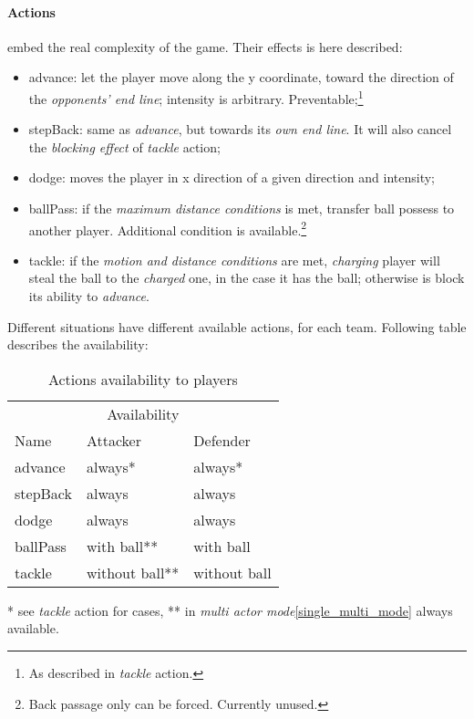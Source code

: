 \documentclass{article}
\begin{document}
\paragraph{Actions}\label{actions_description} embed the real complexity of the game. Their effects is here described:
\begin{itemize}
    \item advance: let the player move along the y coordinate, toward the direction of the \emph{opponents' end line}; intensity is arbitrary. Preventable;\footnote{As described in \emph{tackle} action.}
    \item stepBack: same as \emph{advance}, but towards its \emph{own end line}. It will also cancel the \emph{blocking effect} of \emph{tackle} action; 
    \item dodge: moves the player in x direction of a given direction and intensity;
    \item ballPass: if the \emph{maximum distance conditions} is met, transfer ball possess to another player. Additional condition is available.\footnote{Back passage only can be forced. Currently unused.}
    \item tackle\label{tackle_action}: if the \emph{motion and distance conditions} are met, \emph{charging} player will steal the ball to the \emph{charged} one, in the case it has the ball; otherwise is block its ability to \emph{advance}.
\end{itemize}

Different situations have different available actions, for each team. Following table describes the availability:

\begin{table}[H]
  \caption{Actions availability to players}
  \label{actions_tab}
  \centering
  \begin{tabular}{lll}
    \toprule
    \multicolumn{2}{r}{Availability}                   \\
    \cmidrule(r){2-3}
    Name & Attacker & Defender  \\
    \midrule
    advance & always*  & always*   \\
    stepBack     & always & always      \\
    dodge     & always       & always  \\
    ballPass     & with ball**       & with ball  \\
    tackle     & without ball**       & without ball  \\
    \bottomrule
  \end{tabular}
\end{table}
* see \emph{tackle} action for cases,\newline
** in \emph{multi actor mode}\ref{single_multi_mode} always available.
\end{document}
